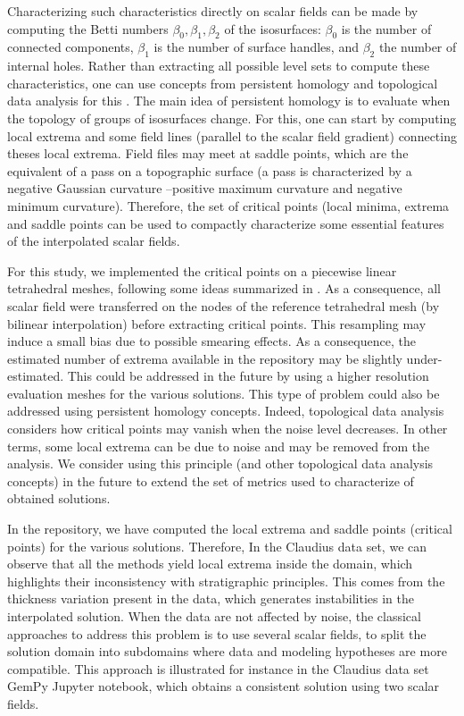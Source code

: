 \documentclass[final]{ring20}
\begin{document}
{Characterizing such characteristics directly on scalar fields can be made by computing the Betti numbers $\beta_0, \beta_1, \beta_2$ of the isosurfaces: $\beta_0$ is the number of connected components, $\beta_1$ is the number of surface handles, and $\beta_2$ the number of internal holes. Rather than extracting all possible level sets to compute these characteristics, one can use concepts from persistent homology and topological data analysis for this \citep[e.g.,][]{Chazal2017ACMS,Tierny2017,Wasserman2018}. The main idea of persistent homology is to evaluate when the topology of groups of isosurfaces change. For this, one can start by computing local extrema and some field lines (parallel to the scalar field gradient) connecting theses local extrema. Field files may meet at saddle points, which are the equivalent of a pass on a topographic surface (a pass is characterized by a negative Gaussian curvature --positive maximum curvature and negative minimum curvature). Therefore, the set of critical points (local minima, extrema and saddle points can be used to compactly characterize some essential features of the interpolated scalar fields.

For this study, we implemented the critical points on a piecewise linear tetrahedral meshes, following some ideas summarized in \citep{Tierny2017}. As a consequence, all scalar field were transferred on the nodes of the reference tetrahedral mesh (by bilinear interpolation) before extracting critical points. This resampling may induce a small bias due to possible smearing effects. As a consequence, the estimated number of extrema available in the repository may be slightly under-estimated. 
This could be addressed in the future by using a higher resolution evaluation meshes for the various solutions. This type of problem could also be addressed using persistent homology concepts. Indeed, topological data analysis considers how critical points may vanish when the noise level decreases. In other terms, some local extrema can be due to noise and may be removed from the analysis. We consider using this principle (and other topological data analysis concepts) in the future to extend the set of metrics used to characterize of obtained solutions. 

In the repository, we have computed the local extrema and saddle points (critical points) for the various solutions. Therefore, In the Claudius data set, we can observe that all the methods yield local extrema inside the domain, which highlights their inconsistency with stratigraphic principles. This comes from the thickness variation present in the data, which generates instabilities in the interpolated solution. When the data are not affected by noise, the classical approaches to address this problem is to use several scalar fields, to split the solution domain into subdomains where data and modeling hypotheses are more compatible. This approach is illustrated for instance in the Claudius data set GemPy Jupyter notebook, which obtains a consistent solution using two scalar fields. 


}
\end{document}
